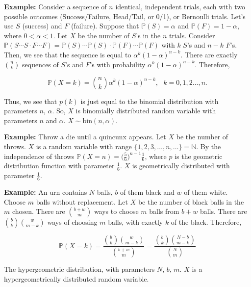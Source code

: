 \documentclass[12pt]{article}
\newcommand{\N}{\mathbb{N}}
\newcommand{\prob}[1]{\mathbb{P}(#1)}
\begin{document}
\begin{tcolorbox}
\textbf{Example:} Consider a sequence of $n$ identical, independent trials, each with two possible outcomes (Success/Failure, Head/Tail, or 0/1), or Bernoulli trials. Let's use $S$ (success) and $F$ (failure). Suppose that $\prob{S} = \alpha$ and $\prob{F} = 1 - \alpha$, where $0  < \alpha < 1$. Let $X$ be the number of $S$'s in the $n$ trials. Consider $\prob{S \cdots S \cdot F \cdots F} = \prob{S} \cdots \prob{S} \cdot \prob{F} \cdots \prob{F}$ with $k$ $S$'s and $n-k$ $F$'s. Then, we see that the sequence is equal to $\alpha^k (1 - \alpha)^{n-k}$. There are exactly ${n \choose k}$ sequences of $S$'s and $F$'s with probability $\alpha^k (1 - \alpha)^{n-k}$. Therefore, 


\begin{equation*}
\prob{X = k} = {n \choose k} \alpha^k (1 - \alpha)^{n-k}, \text{ } k = 0, 1, 2 \ldots, n.
\end{equation*}

\noindent
Thus, we see that $p(k)$ is just equal to the binomial distribution with parameters $n$, $\alpha$. So, $X$ is binomially distributed random variable with parameters $n$ and $\alpha$. $X \sim \text{bin}(n, \alpha)$.
\end{tcolorbox}

\begin{tcolorbox}
\textbf{Example:} Throw a die until a quincunx appears. Let $X$ be the number of throws. $X$ is a random variable with range $\{ 1, 2, 3, \ldots, n, \ldots \} = \N$. By the independence of throws $\prob{X = n} = \big ( \frac{5}{6} \big )^{n-1} \frac{1}{6}$, where $p$ is the geometric distribution function with parameter $\frac{1}{6}$. $X$ is geometrically distributed with parameter $\frac{1}{6}$.
\end{tcolorbox}

\begin{tcolorbox}
\textbf{Example:} An urn contains $N$ balls, $b$ of them black and $w$ of them white. Choose $m$ balls without replacement. Let $X$ be the number of black balls in the $m$ chosen. There are ${b+w \choose m}$ ways to choose $m$ balls from $b+w$ balls. There are ${b \choose k}{w \choose m-k}$ ways of choosing $m$ balls, with exactly $k$ of the black. Therefore, 

\begin{equation*}
\prob{X = k} = \frac{{b \choose k}{w \choose m-k}}{{b+w \choose m}} = \frac{{b \choose k}{N - b \choose m-k}}{{N \choose m}}
\end{equation*}

\noindent
The hypergeometric distribution, with parameters $N$, $b$, $m$. $X$ is a hypergeometrically distributed random variable.
\end{tcolorbox}
\end{document}
